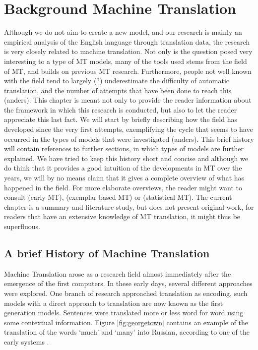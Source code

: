 \documentclass{report}
\author{}
\title{}
\theoremstyle{definition}
\theoremstyle{plain}
\begin{document}
\chapter{Background Machine Translation}

Although we do not aim to create a new model, and our research is mainly an empirical analysis of the English language through translation data, the research is very closely related to machine translation. Not only is the question posed very interesting to a type of MT models,  many of the tools used stems from the field of MT, and builds on previous MT research. Furthermore, people not well known with the field tend to largely (?) underestimate the difficulty of automatic translation, and the number of attempts that have been done to reach this (anders). This chapter is meant not only to provide the reader information about the framework in which this research is conducted, but also to let the reader appreciate this last fact. We will start by briefly describing how the field has developed since the very first attempts, exemplifying the cycle that seems to have occurred in the types of models that were investigated (anders). This brief history will contain references to further sections, in which types of models are further explained. We have tried to keep this history short and concise and although we do think that it provides a good intuition of the developments in MT over the years, we will by no means claim that it gives a complete overview of what has happened in the field. For more elaborate overviews, the reader might want to consult \cite{hutchins1992introduction} (early MT), \cite{somers1999review} (exemplar based MT) or \cite{koehn2008statistical} (statistical MT). The current chapter is a summary and literature study, but does not present original work, for readers that have an extensive knowledge of MT translation, it might thus be superfluous. 



\section{A brief History of Machine Translation}

Machine Translation arose as a research field almost immediately after the emergence of the first computers. In these early days, several different approaches were explored. One branch of research approached translation as encoding, such models with a direct approach to translation are now known as the first generation models. Sentences were translated more or less word for word using some contextual information. Figure \ref{fig:georgetown} contains an example of the translation of the words `much' and `many' into Russian, according to one of the early systems \citep{dostert1955georgetown}.
\end{document}
